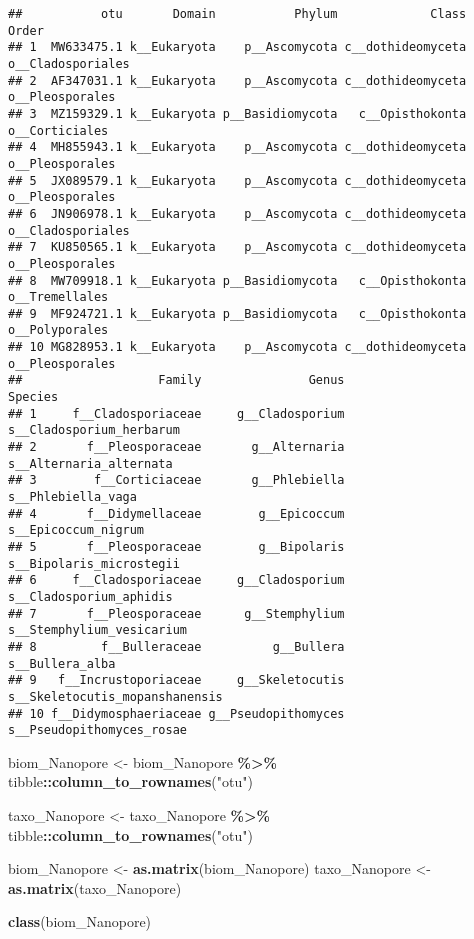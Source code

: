 \documentclass[
]{article}
\newenvironment{Shaded}{\begin{snugshade}}{\end{snugshade}}
\newcommand{\FunctionTok}[1]{\textcolor[rgb]{0.13,0.29,0.53}{\textbf{#1}}}
\newcommand{\NormalTok}[1]{#1}
\newcommand{\OtherTok}[1]{\textcolor[rgb]{0.56,0.35,0.01}{#1}}
\newcommand{\SpecialCharTok}[1]{\textcolor[rgb]{0.81,0.36,0.00}{\textbf{#1}}}
\newcommand{\StringTok}[1]{\textcolor[rgb]{0.31,0.60,0.02}{#1}}
\begin{document}
\begin{verbatim}
##           otu       Domain           Phylum             Class             Order
## 1  MW633475.1 k__Eukaryota    p__Ascomycota c__dothideomyceta o__Cladosporiales
## 2  AF347031.1 k__Eukaryota    p__Ascomycota c__dothideomyceta   o__Pleosporales
## 3  MZ159329.1 k__Eukaryota p__Basidiomycota   c__Opisthokonta    o__Corticiales
## 4  MH855943.1 k__Eukaryota    p__Ascomycota c__dothideomyceta   o__Pleosporales
## 5  JX089579.1 k__Eukaryota    p__Ascomycota c__dothideomyceta   o__Pleosporales
## 6  JN906978.1 k__Eukaryota    p__Ascomycota c__dothideomyceta o__Cladosporiales
## 7  KU850565.1 k__Eukaryota    p__Ascomycota c__dothideomyceta   o__Pleosporales
## 8  MW709918.1 k__Eukaryota p__Basidiomycota   c__Opisthokonta    o__Tremellales
## 9  MF924721.1 k__Eukaryota p__Basidiomycota   c__Opisthokonta    o__Polyporales
## 10 MG828953.1 k__Eukaryota    p__Ascomycota c__dothideomyceta   o__Pleosporales
##                   Family               Genus                        Species
## 1     f__Cladosporiaceae     g__Cladosporium       s__Cladosporium_herbarum
## 2       f__Pleosporaceae       g__Alternaria        s__Alternaria_alternata
## 3        f__Corticiaceae       g__Phlebiella             s__Phlebiella_vaga
## 4       f__Didymellaceae        g__Epicoccum            s__Epicoccum_nigrum
## 5       f__Pleosporaceae        g__Bipolaris       s__Bipolaris_microstegii
## 6     f__Cladosporiaceae     g__Cladosporium        s__Cladosporium_aphidis
## 7       f__Pleosporaceae      g__Stemphylium      s__Stemphylium_vesicarium
## 8         f__Bulleraceae          g__Bullera                s__Bullera_alba
## 9   f__Incrustoporiaceae     g__Skeletocutis s__Skeletocutis_mopanshanensis
## 10 f__Didymosphaeriaceae g__Pseudopithomyces      s__Pseudopithomyces_rosae
\end{verbatim}

\begin{Shaded}
\begin{Highlighting}[]
\NormalTok{biom\_Nanopore }\OtherTok{\textless{}{-}}\NormalTok{ biom\_Nanopore }\SpecialCharTok{\%\textgreater{}\%}
\NormalTok{  tibble}\SpecialCharTok{::}\FunctionTok{column\_to\_rownames}\NormalTok{(}\StringTok{"otu"}\NormalTok{) }

\NormalTok{taxo\_Nanopore }\OtherTok{\textless{}{-}}\NormalTok{ taxo\_Nanopore }\SpecialCharTok{\%\textgreater{}\%}
\NormalTok{  tibble}\SpecialCharTok{::}\FunctionTok{column\_to\_rownames}\NormalTok{(}\StringTok{"otu"}\NormalTok{) }


\NormalTok{biom\_Nanopore }\OtherTok{\textless{}{-}} \FunctionTok{as.matrix}\NormalTok{(biom\_Nanopore)}
\NormalTok{taxo\_Nanopore }\OtherTok{\textless{}{-}} \FunctionTok{as.matrix}\NormalTok{(taxo\_Nanopore)}

\FunctionTok{class}\NormalTok{(biom\_Nanopore)}
\end{Highlighting}
\end{Shaded}
\end{document}
